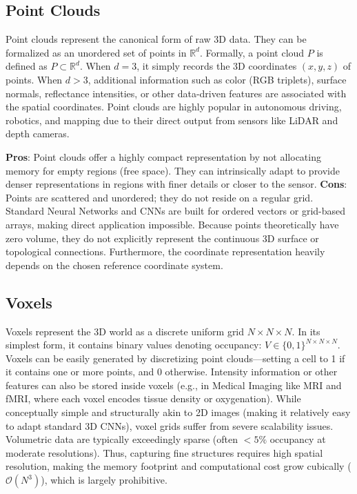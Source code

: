 \subsection{Point Clouds}
Point clouds represent the canonical form of raw 3D data. They can be formalized as an unordered set of points in $\mathbb{R}^d$. Formally, a point cloud $P$ is defined as $P \subset \mathbb{R}^d$. When $d=3$, it simply records the 3D coordinates $(x, y, z)$ of points. When $d>3$, additional information such as color (RGB triplets), surface normals, reflectance intensities, or other data-driven features are associated with the spatial coordinates. Point clouds are highly popular in autonomous driving, robotics, and mapping due to their direct output from sensors like LiDAR and depth cameras.
\begin{insightbox}
\textbf{Pros}: Point clouds offer a highly compact representation by not allocating memory for empty regions (free space). They can intrinsically adapt to provide denser representations in regions with finer details or closer to the sensor.
\textbf{Cons}: Points are scattered and unordered; they do not reside on a regular grid. Standard Neural Networks and CNNs are built for ordered vectors or grid-based arrays, making direct application impossible. Because points theoretically have zero volume, they do not explicitly represent the continuous 3D surface or topological connections. Furthermore, the coordinate representation heavily depends on the chosen reference coordinate system.
\end{insightbox}

\subsection{Voxels}
Voxels represent the 3D world as a discrete uniform grid $N \times N \times N$. In its simplest form, it contains binary values denoting occupancy: $V \in \{0,1\}^{N \times N \times N}$. Voxels can be easily generated by discretizing point clouds—setting a cell to 1 if it contains one or more points, and 0 otherwise. Intensity information or other features can also be stored inside voxels (e.g., in Medical Imaging like MRI and fMRI, where each voxel encodes tissue density or oxygenation).
While conceptually simple and structurally akin to 2D images (making it relatively easy to adapt standard 3D CNNs), voxel grids suffer from severe scalability issues. Volumetric data are typically exceedingly sparse (often $<5\%$ occupancy at moderate resolutions). Thus, capturing fine structures requires high spatial resolution, making the memory footprint and computational cost grow cubically ($\mathcal{O}(N^3)$), which is largely prohibitive.

